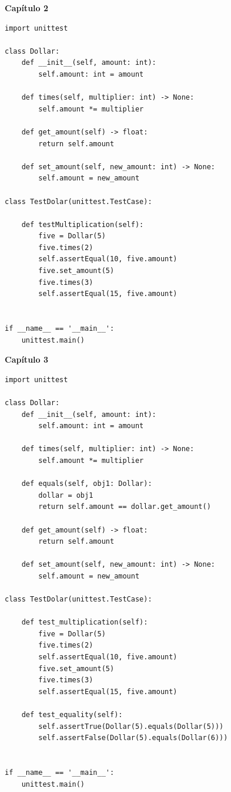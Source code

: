 \documentclass[a4paper,12pt]{article}
\newcommand{\capitulo}[1]{
    \vspace{1em}
    \noindent
    \colorbox{black!15}{
        \parbox{\dimexpr\linewidth-2\fboxsep}{
            \centering \Large \textbf{#1}
        }
    }
    \vspace{1em}
}
\begin{document}
\capitulo{Capítulo 2}
\begin{lstlisting}[style=pythonstyle]
import unittest

class Dollar:
    def __init__(self, amount: int):
        self.amount: int = amount

    def times(self, multiplier: int) -> None:
        self.amount *= multiplier

    def get_amount(self) -> float:
        return self.amount

    def set_amount(self, new_amount: int) -> None:
        self.amount = new_amount

class TestDolar(unittest.TestCase):

    def testMultiplication(self):
        five = Dollar(5)
        five.times(2) 
        self.assertEqual(10, five.amount)
        five.set_amount(5)
        five.times(3) 
        self.assertEqual(15, five.amount)


if __name__ == '__main__':
    unittest.main()
\end{lstlisting}

\capitulo{Capítulo 3}
\begin{lstlisting}[style=pythonstyle]
import unittest

class Dollar:
    def __init__(self, amount: int):
        self.amount: int = amount

    def times(self, multiplier: int) -> None:
        self.amount *= multiplier

    def equals(self, obj1: Dollar):
        dollar = obj1
        return self.amount == dollar.get_amount()

    def get_amount(self) -> float:
        return self.amount

    def set_amount(self, new_amount: int) -> None:
        self.amount = new_amount

class TestDolar(unittest.TestCase):

    def test_multiplication(self):
        five = Dollar(5)
        five.times(2) 
        self.assertEqual(10, five.amount)
        five.set_amount(5)
        five.times(3) 
        self.assertEqual(15, five.amount)

    def test_equality(self):
        self.assertTrue(Dollar(5).equals(Dollar(5)))
        self.assertFalse(Dollar(5).equals(Dollar(6)))


if __name__ == '__main__':
    unittest.main()
\end{lstlisting}
\end{document}

